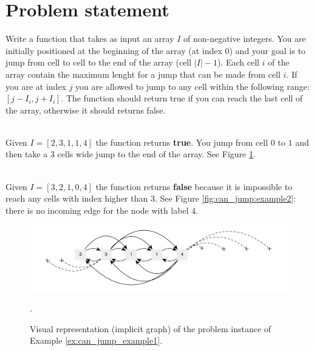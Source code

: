 \section{Problem statement}
\label{ch:can_jump:statement}
\begin{exercise}
Write a function that takes as input an array $I$ of non-negative integers. You are initially
positioned at the beginning of the array (at index $0$) and your goal is to jump from cell to cell
to the end of the array (cell $|I|-1$).
Each cell $i$ of the array contain the maximum lenght for a jump that can be made from cell $i$.
If you are at index $j$ you are allowed to jump to any cell within the following range: $[j-I_i,j+I_i]$.
The function should return true if you can reach the last cell of the array, otherwise it should returns false.

    \begin{example}
        \hfill \\
        Given  $I=[2,3,1,1,4]$ the function returns \textbf{true}. You jump from cell $0$ to $1$ and
        then take a $3$ cells wide jump to the end of the array. See Figure
        \ref{fig:can_jump:example1}.
        \label{ex:can_jump_example1}
    \end{example}

    \begin{example}
        \hfill \\
        Given $I=[3,2,1,0,4]$ the function returns \textbf{false} because it is impossible to reach
        any cells with index higher than $3$. See Figure \ref{fig:can_jump:example2}: there is no
        incoming edge for the node with label $4$.
        \label{ex:can_jump_example2}
    \end{example}
\end{exercise}

\begin{figure}
    \centering
    \includegraphics[width=\textwidth]{sources/can_jump/images/can_jump_example1}
    \caption[Implicit graph for the Example \ref{ex:can_jump_example1}.]
    {Visual representation (implicit graph) of the problem instance of Example
    \ref{ex:can_jump_example1}.}.
    \label{fig:can_jump:example1}
\end{figure}

